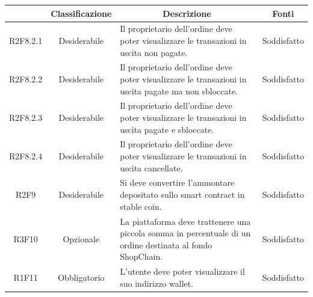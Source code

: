 \begin{table}[H]
    \centering
    \renewcommand{\arraystretch}{1.8}
    \begin{tabular}{c | c | p{6cm} | c}
        \rowcolor[HTML]{125E28}
        \multicolumn{1}{c}{\color[HTML]{FFFFFF} \textbf{Codice}}          &
        \multicolumn{1}{c}{\color[HTML]{FFFFFF} \textbf{Classificazione}} &
        \multicolumn{1}{c}{\color[HTML]{FFFFFF} \textbf{Descrizione}}     &
        \multicolumn{1}{c}{\color[HTML]{FFFFFF} \textbf{Fonti}}                                                                                                                                                                  \\
        \hline
        R2F8.2.1                                                          & Desiderabile & Il proprietario dell'ordine deve poter visualizzare le transazioni in uscita non pagate.                   & Soddisfatto                  \\
        R2F8.2.2                                                          & Desiderabile & Il proprietario dell'ordine deve poter visualizzare le transazioni in uscita pagate ma non sbloccate.      & Soddisfatto                  \\
        R2F8.2.3                                                          & Desiderabile & Il proprietario dell'ordine deve poter visualizzare le transazioni in uscita pagate e sbloccate.           & Soddisfatto                  \\
        R2F8.2.4                                                          & Desiderabile & Il proprietario dell'ordine deve poter visualizzare le transazioni in uscita cancellate.                   & Soddisfatto                  \\
        R2F9                                                              & Desiderabile & Si deve convertire l'ammontare depositato sullo smart contract\glo{} in stable coin\glo{}.                 & Soddisfatto               \\
        R3F10                                                             & Opzionale    & La piattaforma deve trattenere una piccola somma in percentuale di un ordine destinata al fondo ShopChain. & Soddisfatto \\
        R1F11                                                             & Obbligatorio & L'utente deve poter visualizzare il suo indirizzo wallet\glo{}.                                                  & Soddisfatto                      \\

\end{tabular}
\end{table}
